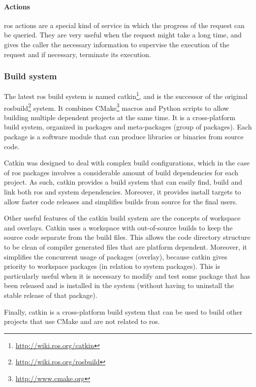 \paragraph{Actions}

\gls{ros} actions are a special kind of service in which the progress of the request can be queried. They are very useful when the request might take a long time, and gives the caller the necessary information to supervise the execution of the request and if necessary, terminate its execution.


\subsubsection{Build system}

The latest \gls{ros} build system is named catkin\footnote{\url{http://wiki.ros.org/catkin}}, and is the successor of the original rosbuild\footnote{\url{http://wiki.ros.org/rosbuild}} system. It combines CMake\footnote{\url{http://www.cmake.org}} macros and Python scripts to allow building multiple dependent projects at the same time. It is a cross-platform build system, organized in packages and meta-packages (group of packages). Each package is a software module that can produce libraries or binaries from source code.

Catkin was designed to deal with complex build configurations, which in the case of \gls{ros} packages involves a considerable amount of build dependencies for each project. As such, catkin provides a build system that can easily find, build and link both \gls{ros} and system dependencies. Moreover, it provides install targets to allow faster code releases and simplifies builds from source for the final users.

Other useful features of the catkin build system are the concepts of workspace and overlays. Catkin uses a workspace with out-of-source builds to keep the source code separate from the build files. This allows the code directory structure to be clean of compiler generated files that are platform dependent. Moreover, it simplifies the concurrent usage of packages (overlay), because catkin gives priority to workspace packages (in relation to system packages). This is particularly useful when it is necessary to modify and test some package that has been released and is installed in the system (without having to uninstall the stable release of that package).

Finally, catkin is a cross-platform build system that can be used to build other projects that use CMake and are not related to \gls{ros}.


